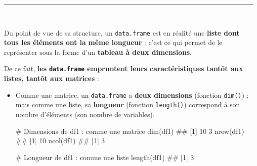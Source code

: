 \documentclass[12pt,twosided, notitlepage]{book}
\newenvironment{Shaded}{}{}
\newcommand{\KeywordTok}[1]{\textcolor[rgb]{0.00,0.00,1.00}{{#1}}}
\newcommand{\CommentTok}[1]{\textcolor[rgb]{0.00,0.50,0.00}{{#1}}}
\newcommand{\NormalTok}[1]{{#1}}
\renewenvironment{Shaded}{\begin{snugshade}}{\end{snugshade}}
\begin{document}
\begin{center}\rule{0.5\linewidth}{\linethickness}\end{center}

~

Du point de vue de sa structure, un \texttt{data.frame} est en réalité
une \textbf{liste dont tous les éléments ont la même longueur} : c'est
ce qui permet de le représenter sous la forme d'un \textbf{tableau à
deux dimensions}.

\begin{Shaded}
\end{Shaded}

De ce fait, \textbf{les \texttt{data.frame} empruntent leurs
caractéristiques tantôt aux listes, tantôt aux matrices} :

\begin{itemize}
\item
  Comme une matrice, un \texttt{data.frame} a \textbf{deux dimensions}
  (fonction
  \texttt{dim()})
  ; mais comme une liste, sa \textbf{longueur} (fonction
  \texttt{length()}) correspond à son nombre
  d'éléments (son nombre de variables).

\begin{Shaded}
\begin{Highlighting}[]
\CommentTok{# Dimensions de df1 : comme une matrice}
\KeywordTok{dim}\NormalTok{(df1)}
  \NormalTok{## [1] 10  3}
\KeywordTok{nrow}\NormalTok{(df1)}
  \NormalTok{## [1] 10}
\KeywordTok{ncol}\NormalTok{(df1)}
  \NormalTok{## [1] 3}

\CommentTok{# Longueur de df1 : comme une liste}
\KeywordTok{length}\NormalTok{(df1)}
  \NormalTok{## [1] 3}
\end{Highlighting}
\end{Shaded}
\end{itemize}

~
\end{document}
